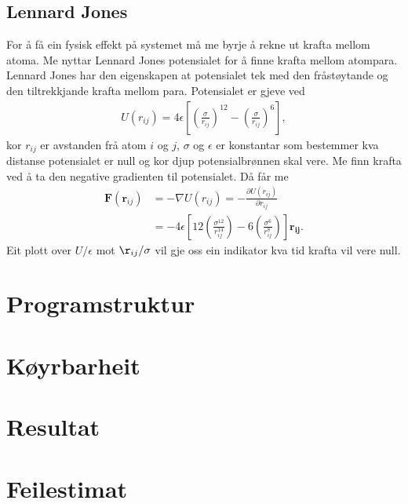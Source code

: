 \documentclass[12pt, a4paper]{article}
\theoremstyle{definition}
\newcommand{\vb}{\mathbf}
\begin{document}
    \subsection*{Lennard Jones}
        For å få ein fysisk effekt på systemet må me byrje å rekne ut krafta mellom atoma. Me nyttar Lennard Jones potensialet for å finne krafta mellom atompara.
        Lennard Jones har den eigenskapen at potensialet tek med den fråstøytande og den tiltrekkjande krafta mellom para. Potensialet er gjeve ved
        \begin{align*}
            U(r_{ij}) = 4\epsilon\left[ \left( \frac{\sigma}{r_{ij}} \right)^{12} - \left( \frac{\sigma}{r_{ij}} \right)^{6} \right],
        \end{align*}
        kor $r_{ij}$ er avstanden frå atom $i$ og $j$, $\sigma$ og $\epsilon$ er konstantar som bestemmer kva distanse potensialet er null og kor djup potensialbrønnen skal vere.
        Me finn krafta ved å ta den negative gradienten til potensialet. Då får me
        \begin{align*}
            \vb{F}(\vb{r}_{ij}) &= -\nabla U(r_{ij}) = -\frac{\partial U(r_{ij})}{\partial r_{ij}} \\
            &= -4\epsilon\left[ 12\left( \frac{\sigma^{12}}{r_{ij}^{14}} \right) - 6\left( \frac{\sigma^6}{r_{ij}^8} \right) \right]\vb{r_{ij}}.
        \end{align*}
        Eit plott over $U/\epsilon$ mot $\r_{ij}/\sigma$ vil gje oss ein indikator kva tid krafta vil vere null. %





        \newpage


\section*{Programstruktur}



\newpage


\section*{Køyrbarheit}




\newpage


\section*{Resultat}



\newpage


\section*{Feilestimat}
\end{document}
